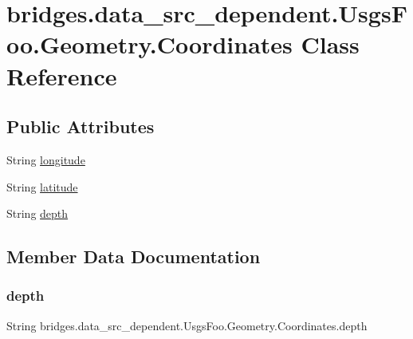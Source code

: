 \hypertarget{classbridges_1_1data__src__dependent_1_1_usgs_foo_1_1_geometry_1_1_coordinates}{}\section{bridges.\+data\+\_\+src\+\_\+dependent.\+Usgs\+Foo.\+Geometry.\+Coordinates Class Reference}
\label{classbridges_1_1data__src__dependent_1_1_usgs_foo_1_1_geometry_1_1_coordinates}
\subsection*{Public Attributes}
\begin{DoxyCompactItemize}
\item 
String \hyperlink{classbridges_1_1data__src__dependent_1_1_usgs_foo_1_1_geometry_1_1_coordinates_a45f2a0dc4220eb4a1e8ec576101f9633}{longitude}
\item 
String \hyperlink{classbridges_1_1data__src__dependent_1_1_usgs_foo_1_1_geometry_1_1_coordinates_a8ab648886a19cd5d07f330e1558b8175}{latitude}
\item 
String \hyperlink{classbridges_1_1data__src__dependent_1_1_usgs_foo_1_1_geometry_1_1_coordinates_aa566d321ac49828fffd447821bd4e72d}{depth}
\end{DoxyCompactItemize}


\subsection{Member Data Documentation}
\hypertarget{classbridges_1_1data__src__dependent_1_1_usgs_foo_1_1_geometry_1_1_coordinates_aa566d321ac49828fffd447821bd4e72d}{}\label{classbridges_1_1data__src__dependent_1_1_usgs_foo_1_1_geometry_1_1_coordinates_aa566d321ac49828fffd447821bd4e72d} 
\subsubsection{\texorpdfstring{depth}{depth}}
{\footnotesize\ttfamily String bridges.\+data\+\_\+src\+\_\+dependent.\+Usgs\+Foo.\+Geometry.\+Coordinates.\+depth}

